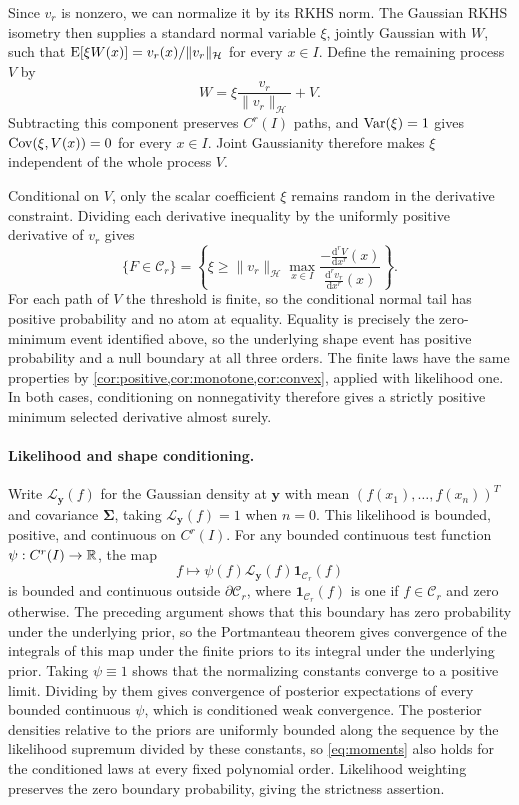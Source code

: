 \begin{proofEnd}
Since $v_r$ is nonzero, we can normalize it by its RKHS norm.
The Gaussian RKHS isometry \citep[Lemma 2.3]{vdv2008rkhs} then supplies
a standard normal variable $\xi$, jointly Gaussian with $W$, such that
$\operatorname{E}[\xi W(x)]=v_r(x)/\|v_r\|_{\mathcal H}$ for every $x\in I$.
Define the remaining process $V$ by
\[
 W=\xi\frac{v_r}{\|v_r\|_{\mathcal H}}+V.
\]
Subtracting this component preserves $C^r(I)$ paths, and
$\operatorname{Var}(\xi)=1$ gives $\operatorname{Cov}(\xi,V(x))=0$ for every $x\in I$.
Joint Gaussianity therefore makes $\xi$ independent of the whole
process $V$.

Conditional on $V$, only the scalar coefficient $\xi$ remains random
in the derivative constraint. Dividing each derivative inequality by
the uniformly positive derivative of $v_r$ gives
\[
 \{F\in\mathcal C_r\}=
 \left\{\xi\geq\|v_r\|_{\mathcal H}
       \max_{x\in I}\frac{-\frac{\mathrm{d}^rV}{\mathrm{d}x^r}(x)}
                              {\frac{\mathrm{d}^rv_r}{\mathrm{d}x^r}(x)}\right\}.
\]
For each path of $V$ the threshold is finite, so the conditional normal
tail has positive probability and no atom at equality. Equality
is precisely the zero-minimum event identified above, so the underlying
shape event has positive probability and a null boundary at all three
orders. The finite laws have the same properties by
\cref{cor:positive,cor:monotone,cor:convex}, applied with
likelihood one. In both cases, conditioning on nonnegativity therefore
gives a strictly positive minimum selected derivative almost surely.

\paragraph{Likelihood and shape conditioning.}
Write $\mathcal L_{\boldsymbol y}(f)$ for the Gaussian density at
$\boldsymbol y$ with mean $(f(x_1),\ldots,f(x_n))^T$ and covariance
$\boldsymbol\Sigma$, taking $\mathcal L_{\boldsymbol y}(f)=1$ when
$n=0$. This likelihood is bounded, positive, and continuous on
$C^r(I)$. For any bounded continuous test function
$\psi:C^r(I)\to\mathbb R$, the map
\[
 f\longmapsto\psi(f)\mathcal L_{\boldsymbol y}(f)
                    \boldsymbol1_{\mathcal C_r}(f)
\]
is bounded and continuous outside $\partial\mathcal C_r$, where
$\boldsymbol1_{\mathcal C_r}(f)$ is one if $f\in\mathcal C_r$ and
zero otherwise. The preceding argument shows that this boundary
has zero probability under the underlying prior, so the Portmanteau theorem
\citep[Section 2]{billingsley1999convergence}
gives convergence of the integrals of this map under the finite priors
to its integral under the underlying prior.
Taking $\psi\equiv1$ shows that the normalizing constants converge
to a positive limit. Dividing by them gives convergence of posterior
expectations of every bounded continuous $\psi$, which is conditioned
weak convergence. The posterior densities relative to the priors are
uniformly bounded along the sequence by the likelihood supremum
divided by these constants, so
\cref{eq:moments} also holds for the conditioned laws at every fixed
polynomial order. Likelihood weighting preserves the zero boundary
probability, giving the strictness assertion.


\end{proofEnd}
